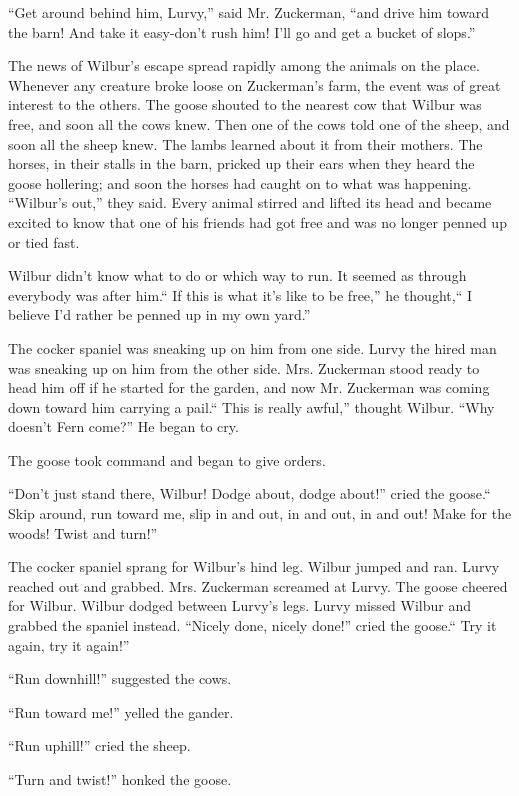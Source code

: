 \documentclass[a4paper, oneside]{book}
\begin{document}
 ``Get around behind him, Lurvy,'' said Mr. Zuckerman, ``and drive
him toward the barn! And take it easy-don't rush him! I'll go and
get a bucket of slops.''   
  
The news of Wilbur's escape spread rapidly among the animals on
the place. Whenever any creature broke loose on Zuckerman's farm, 
the event was of great interest to the others. The goose shouted to
the nearest cow that Wilbur was free, and soon all the cows knew.
Then one of the cows told one of the sheep, and soon all the sheep
knew. The lambs learned about it from their mothers. The horses,
in their stalls in the barn, pricked up their ears when they heard
the goose hollering; and soon the horses had caught on to what was
happening. ``Wilbur's out,'' they said. Every animal stirred and
lifted its head and became excited to know that one of his friends
had got free and was no longer penned up or tied fast. 

Wilbur didn't know what to do or which way to run. It seemed as
through everybody was after him.`` If this is what it's like to be
free,'' he thought,`` I believe I'd rather be penned up in my own
yard.''

 The cocker spaniel was sneaking up on him from one side. Lurvy
the hired man was sneaking up on him from the other side. Mrs.
Zuckerman stood ready to head him off if he started for the garden,
and now Mr. Zuckerman was coming down toward him carrying a
pail.`` This is really awful,'' thought Wilbur. ``Why doesn't Fern
come?'' He began to cry. 
  
The goose took command and began to give orders. 

 ``Don't just stand there, Wilbur! Dodge about, dodge about!'' cried
the goose.`` Skip around, run toward me, slip in and out, in and out,
in and out! Make for the woods! Twist and turn!''

 The cocker spaniel sprang for Wilbur's hind leg. Wilbur jumped
and ran. Lurvy reached out and grabbed. Mrs. Zuckerman
screamed at Lurvy. The goose cheered for Wilbur. Wilbur dodged
between Lurvy's legs. Lurvy missed Wilbur and grabbed the
spaniel instead. ``Nicely done, nicely done!'' cried the goose.`` Try it
again, try it again!'' 

 ``Run downhill!'' suggested the cows.
 
 ``Run toward me!'' yelled the gander.
 
 ``Run uphill!'' cried the sheep.
 
 ``Turn and twist!'' honked the goose.
 
\end{document}
